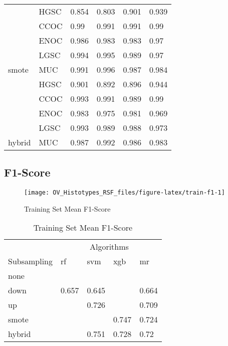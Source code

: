 \documentclass[
]{report}
\begin{document}
\begin{table}
\begin{tabular}[t]{l|l|l|l|l|l}
\cline{1-6}
 & HGSC & 0.854 & 0.803 & 0.901 & 0.939\\
\cline{2-6}
 & CCOC & 0.99 & 0.991 & 0.991 & 0.99\\
\cline{2-6}
 & ENOC & 0.986 & 0.983 & 0.983 & 0.97\\
\cline{2-6}
 & LGSC & 0.994 & 0.995 & 0.989 & 0.97\\
\cline{2-6}
\multirow{-5}{*}{\raggedright\arraybackslash smote} & MUC & 0.991 & 0.996 & 0.987 & 0.984\\
\cline{1-6}
 & HGSC & 0.901 & 0.892 & 0.896 & 0.944\\
\cline{2-6}
 & CCOC & 0.993 & 0.991 & 0.989 & 0.99\\
\cline{2-6}
 & ENOC & 0.983 & 0.975 & 0.981 & 0.969\\
\cline{2-6}
 & LGSC & 0.993 & 0.989 & 0.988 & 0.973\\
\cline{2-6}
\multirow{-5}{*}{\raggedright\arraybackslash hybrid} & MUC & 0.987 & 0.992 & 0.986 & 0.983\\
\hline
\end{tabular}
\end{table}

\hypertarget{f1-score-1}{%
\subsection{F1-Score}\label{f1-score-1}}

\begin{figure}[H]

{\centering \texttt{[image: OV\_Histotypes\_RSF\_files/figure-latex/train-f1-1]} 

}

\caption{Training Set Mean F1-Score}\label{fig:train-f1}
\end{figure}

\begin{table}

\caption{\label{tab:train-f1-table}Training Set Mean F1-Score}
\centering
\begin{tabular}[t]{l|l|l|l|l}
\hline
\multicolumn{1}{c|}{ } & \multicolumn{4}{c}{Algorithms} \\
\cline{2-5}
Subsampling & rf & svm & xgb & mr\\
\hline
none & \cellcolor[HTML]{FF0000}{0.787} & \cellcolor[HTML]{FFD700}{0.801} & \cellcolor[HTML]{FF0000}{0.897} & \cellcolor[HTML]{FF0000}{0.822}\\
\hline
down & 0.657 & 0.645 & \cellcolor[HTML]{FF0000}{0.231} & 0.664\\
\hline
up & \cellcolor[HTML]{FFD700}{0.755} & 0.726 & \cellcolor[HTML]{FFD700}{0.776} & 0.709\\
\hline
smote & \cellcolor[HTML]{FFD700}{0.748} & \cellcolor[HTML]{FFD700}{0.75} & 0.747 & 0.724\\
\hline
hybrid & \cellcolor[HTML]{90ee90}{0.77} & 0.751 & 0.728 & 0.72\\
\hline
\end{tabular}
\end{table}
\end{document}
